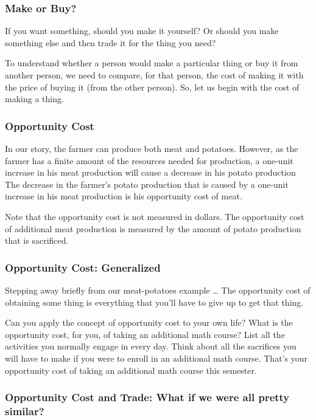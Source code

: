 \documentclass[
  letterpaper,
]{book}
\begin{document}
\subsubsection{Make or Buy?}\label{make-or-buy}

If you want something, should you make it yourself? Or should you make
something else and then trade it for the thing you need?

To understand whether a person would make a particular thing or buy it
from another person, we need to compare, for that person, the cost of
making it with the price of buying it (from the other person). So, let
us begin with the cost of making a thing.

\subsubsection{Opportunity Cost}\label{opportunity-cost}

In our story, the farmer can produce both meat and potatoes. However, as
the farmer has a finite amount of the resources needed for production, a
one-unit increase in his meat production will cause a decrease in his
potato production The decrease in the farmer's potato production that is
caused by a one-unit increase in his meat production is his opportunity
cost of meat.

Note that the opportunity cost is not measured in dollars. The
opportunity cost of additional meat production is measured by the amount
of potato production that is sacrificed.

\subsubsection{Opportunity Cost:
Generalized}\label{opportunity-cost-generalized}

Stepping away briefly from our meat-potatoes example \ldots{} The
opportunity cost of obtaining some thing is everything that you'll have
to give up to get that thing.

Can you apply the concept of opportunity cost to your own life? What is
the opportunity cost, for you, of taking an additional math course? List
all the activities you normally engage in every day. Think about all the
sacrifices you will have to make if you were to enroll in an additional
math course. That's your opportunity cost of taking an additional math
course this semester.

\subsubsection{Opportunity Cost and Trade: What if we were all pretty
similar?}\label{opportunity-cost-and-trade-what-if-we-were-all-pretty-similar}
\end{document}

